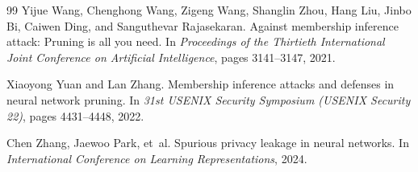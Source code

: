 \documentclass[11pt]{article}
\begin{document}
\begin{thebibliography}{99}
Yijue Wang, Chenghong Wang, Zigeng Wang, Shanglin Zhou, Hang Liu, Jinbo Bi, Caiwen Ding, and Sanguthevar Rajasekaran.
\newblock Against membership inference attack: Pruning is all you need.
\newblock In \emph{Proceedings of the Thirtieth International Joint Conference on Artificial Intelligence}, pages 3141--3147, 2021.

Xiaoyong Yuan and Lan Zhang.
\newblock Membership inference attacks and defenses in neural network pruning.
\newblock In \emph{31st USENIX Security Symposium (USENIX Security 22)}, pages 4431--4448, 2022.

Chen Zhang, Jaewoo Park, et~al.
\newblock Spurious privacy leakage in neural networks.
\newblock In \emph{International Conference on Learning Representations}, 2024.

\end{thebibliography}
\end{document}
